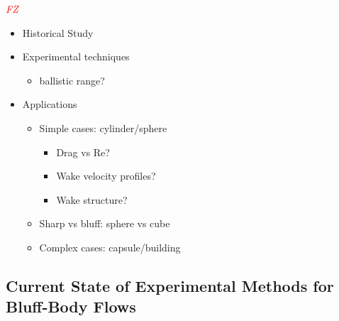 \documentclass[journal]{new-aiaa}
\begin{document}
\textcolor{red}{\emph{FZ}}

\begin{itemize}
    \item Historical Study
    \item Experimental techniques
    \begin{itemize}
        \item ballistic range?
    \end{itemize}
    \item Applications
    \begin{itemize}
        \item Simple cases: cylinder/sphere
        \begin{itemize}
            \item Drag vs Re?
            \item Wake velocity profiles?
            \item Wake structure?
        \end{itemize}
        \item Sharp vs bluff: sphere vs cube
        \item Complex cases: capsule/building
    \end{itemize}
\end{itemize}








\subsection{Current State of Experimental Methods for Bluff-Body Flows} \label{subsec:currentstateexperimental}
































\clearpage

\end{document}
